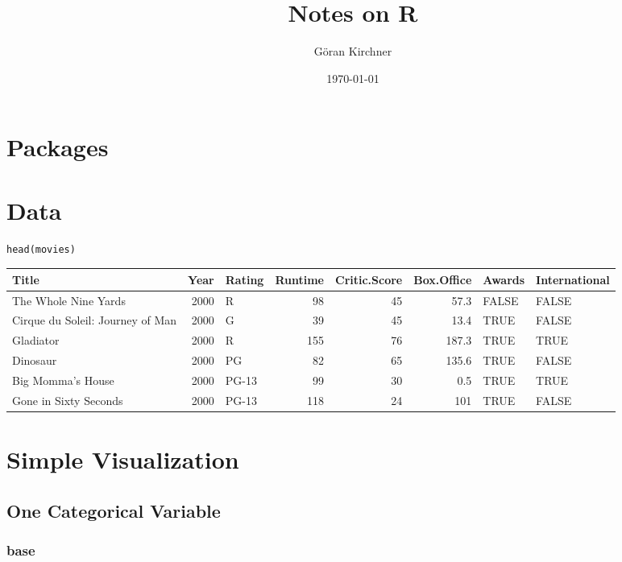 \documentclass[a4paper, captions=tableheading]{tufte-book}
\author{Göran Kirchner}
\date{\today}
\title{Notes on R}
\begin{document}
\maketitle

\chapter{Packages}
\label{sec:orgheadline1}

\chapter{Data}
\label{sec:orgheadline2}

\begin{verbatim}
head(movies)
\end{verbatim}

\begin{center}
\begin{tabular}{lrlrrrll}
\toprule
Title & Year & Rating & Runtime & Critic.Score & Box.Office & Awards & International\\
\midrule
The Whole Nine Yards & 2000 & R & 98 & 45 & 57.3 & FALSE & FALSE\\
Cirque du Soleil: Journey of Man & 2000 & G & 39 & 45 & 13.4 & TRUE & FALSE\\
Gladiator & 2000 & R & 155 & 76 & 187.3 & TRUE & TRUE\\
Dinosaur & 2000 & PG & 82 & 65 & 135.6 & TRUE & FALSE\\
Big Momma's House & 2000 & PG-13 & 99 & 30 & 0.5 & TRUE & TRUE\\
Gone in Sixty Seconds & 2000 & PG-13 & 118 & 24 & 101 & TRUE & FALSE\\
\bottomrule
\end{tabular}
\end{center}

\chapter{Simple Visualization}
\label{sec:orgheadline14}


\section{One Categorical Variable}
\label{sec:orgheadline6}

\subsection{base}
\label{sec:orgheadline3}
\end{document}

